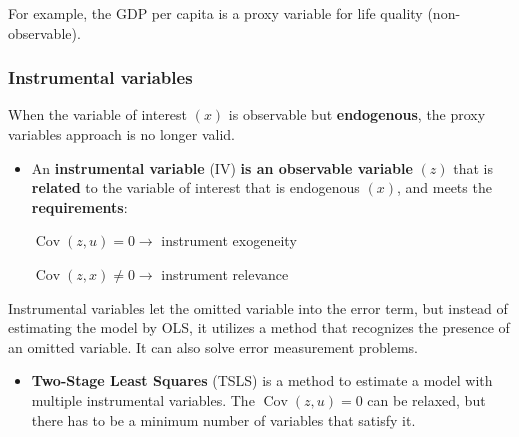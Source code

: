 \documentclass[10pt, a4paper, landscape]{article}
\DeclareMathOperator{\Cov}{Cov}
\begin{document}
\begin{multicols}{3}
For example, the GDP per capita is a proxy variable for life quality (non-observable).

\subsubsection*{Instrumental variables}

When the variable of interest \( (x) \) is observable but \textbf{endogenous}, the proxy variables approach is no longer valid.

\begin{itemize}[leftmargin=*]
	\item An \textbf{instrumental variable} (IV) \textbf{is an observable variable} \( (z) \) that is \textbf{related} to the variable of interest that is endogenous \( (x) \), and meets the \textbf{requirements}:
	\begin{center}
		\( \Cov(z, u) = 0 \rightarrow \) instrument exogeneity

		\( \Cov(z, x) \neq 0 \rightarrow \) instrument relevance
	\end{center}
\end{itemize}

Instrumental variables let the omitted variable into the error term, but instead of estimating the model by OLS, it utilizes a method that recognizes the presence of an omitted variable. It can also solve error measurement problems.

\begin{itemize}[leftmargin=*]
	\item \textbf{Two-Stage Least Squares} (TSLS) is a method to estimate a model with multiple instrumental variables. The \( \Cov(z, u) = 0 \) can be relaxed, but there has to be a minimum number of variables that satisfy it.


\end{itemize}
\end{multicols}
\end{document}
